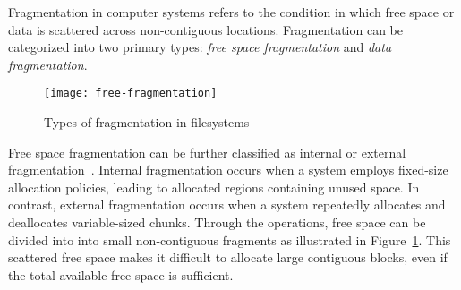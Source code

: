 \begin{comment}
Secondly, SSDs enhance read performance through prefetching, which loads subsequent data in advance based on LBA.
Fragmentation can cause this prefetching to load unnecessary data.\cite{Defragmentation_Log_write_is_ssd_to_bad} For these reasons, filesystem fragmentation is also a concern in SSDs.

\noindent {\textbf{Logical fragmentation and physical fragmentation.}}
I/O performance in flash storage is affected in different ways by logical fragmentation and physical fragmentation.\cite{janusd:atc17}
Logical fragmentation occurs when files are allocated in multiple fragmented storage spaces (extents) within the filesystem.
When a file is not stored contiguously and is spread across various locations, the filesystem recognizes this as being in a logically fragmented state.
As a result, more I/O requests are needed to read the file, which increases overhead in I/O scheduling and handshaking processes.

On the other hand, physical fragmentation happens when the data of a file is allocated non-contiguously at the physical locations of the storage device.
In flash storage, data can be distributed across multiple channels, which directly impacts I/O parallelism.
This can lead to a degradation in I/O performance.
Even if the Physical Block Address (PBA) is contiguous, if the Logical Block Address (LBA) is non-contiguous, separate I/O requests become necessary.
This increases the number of I/O requests, which can lower the overall performance of the system.
Therefore, logical fragmentation and physical fragmentation can occur independently, and appropriate measures are needed to address each issue.
\end{comment}

Fragmentation in computer systems refers to the condition in which free space or data is scattered across non-contiguous locations.
Fragmentation can be categorized into two primary types: \emph{free space fragmentation} and \emph{data fragmentation}.

\begin{figure}
    \centering
    \texttt{[image: free-fragmentation]}
	\caption{Types of fragmentation in filesystems
	}
    \label{fig:free-fragmentation}
\end{figure}

Free space fragmentation can be further classified as internal or external fragmentation~\cite{osteps,os-textbook}.
Internal fragmentation occurs when a system employs fixed-size allocation policies, leading to allocated regions containing unused space.
In contrast, external fragmentation occurs when a system repeatedly allocates and deallocates variable-sized chunks.
Through the operations, free space can be divided into into small non-contiguous fragments as illustrated in Figure~\ref{fig:free-fragmentation}.
This scattered free space makes it difficult to allocate large contiguous blocks, even if the total available free space is sufficient.

